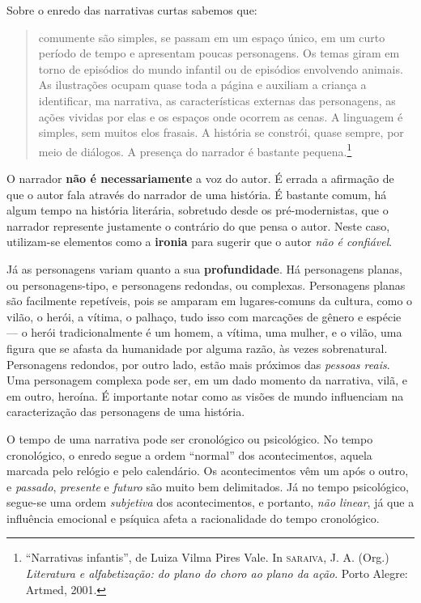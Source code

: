 \documentclass[11pt]{extarticle}
\begin{document}
Sobre o enredo das narrativas curtas sabemos que:

\begin{quote}
comumente são simples, se passam em um espaço único, em um curto período de tempo e apresentam poucas personagens. Os temas giram em torno de episódios do mundo infantil ou de episódios envolvendo animais. As ilustrações ocupam quase toda a página e auxiliam 
a criança a identificar, ma narrativa, as características externas das personagens, as ações vividas por elas e os espaços onde ocorrem as cenas. A linguagem é simples, sem muitos elos frasais. A história se constrói, quase sempre, por meio de diálogos. A presença do narrador é bastante pequena.\footnote{“Narrativas infantis”, de Luiza Vilma Pires Vale. In \textsc{saraiva}, J. A. (Org.) \textit{Literatura e alfabetização: do plano do choro ao plano da ação}. Porto Alegre: Artmed, 2001.}  
\end{quote}

O narrador \textbf{não é necessariamente} a voz do autor. É errada a afirmação de que o autor fala através do narrador de uma história. É bastante comum, há algum tempo na história literária, sobretudo desde os pré-modernistas, que o narrador represente justamente o contrário do que pensa o autor. Neste caso, utilizam-se elementos como a \textbf{ironia} para sugerir que o autor \textit{não é confiável}.

Já as personagens variam quanto a sua \textbf{profundidade}. Há personagens planas, ou personagens-tipo, e personagens redondas, ou complexas. Personagens planas são facilmente repetíveis, pois se amparam em lugares-comuns da cultura, como o vilão, o herói, a vítima, o palhaço, tudo isso com marcações de gênero e espécie --- o herói tradicionalmente é um homem, a vítima, uma mulher, e o vilão, uma figura que se afasta da humanidade por alguma razão, às vezes sobrenatural. Personagens redondos, por outro lado, estão mais próximos das \textit{pessoas reais}. Uma personagem complexa pode ser, em um dado momento da narrativa, vilã, e em outro, heroína. É importante notar como as visões de mundo influenciam na caracterização das personagens de uma história.

O tempo de uma narrativa pode ser cronológico ou psicológico. No tempo cronológico, o enredo segue a ordem ``normal'' dos acontecimentos, aquela marcada pelo relógio e pelo calendário. Os acontecimentos vêm um após o outro, e \textit{passado}, \textit{presente} e \textit{futuro} são muito bem delimitados. Já no tempo psicológico, segue-se uma ordem \textit{subjetiva} dos acontecimentos, e portanto, \textit{não linear}, já que a influência emocional e psíquica afeta a racionalidade do tempo cronológico. 
\end{document}
